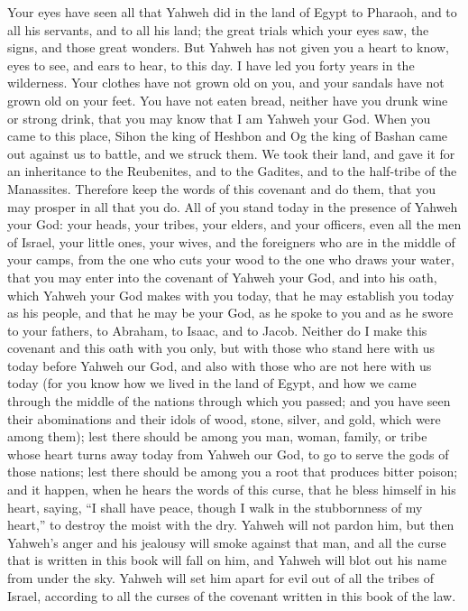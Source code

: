 Your eyes have seen all that Yahweh did in the land of Egypt to Pharaoh,
and to all his servants, and to all his land;  the great
trials which your eyes saw, the signs, and those great wonders.
 But Yahweh has not given you a heart to know, eyes to see,
and ears to hear, to this day.  I have led you forty years
in the wilderness. Your clothes have not grown old on you, and your
sandals have not grown old on your feet.  You have not eaten
bread, neither have you drunk wine or strong drink, that you may know
that I am Yahweh your God.  When you came to this place,
Sihon the king of Heshbon and Og the king of Bashan came out against us
to battle, and we struck them.  We took their land, and gave
it for an inheritance to the Reubenites, and to the Gadites, and to the
half-tribe of the Manassites.  Therefore keep the words of
this covenant and do them, that you may prosper in all that you do.
 All of you stand today in the presence of Yahweh your God:
your heads, your tribes, your elders, and your officers, even all the
men of Israel,  your little ones, your wives, and the
foreigners who are in the middle of your camps, from the one who cuts
your wood to the one who draws your water,  that you may
enter into the covenant of Yahweh your God, and into his oath, which
Yahweh your God makes with you today,  that he may
establish you today as his people, and that he may be your God, as he
spoke to you and as he swore to your fathers, to Abraham, to Isaac, and
to Jacob.  Neither do I make this covenant and this oath
with you only,  but with those who stand here with us today
before Yahweh our God, and also with those who are not here with us
today  (for you know how we lived in the land of Egypt, and
how we came through the middle of the nations through which you passed;
 and you have seen their abominations and their idols of
wood, stone, silver, and gold, which were among them); 
lest there should be among you man, woman, family, or tribe whose heart
turns away today from Yahweh our God, to go to serve the gods of those
nations; lest there should be among you a root that produces bitter
poison;  and it happen, when he hears the words of this
curse, that he bless himself in his heart, saying, ``I shall have peace,
though I walk in the stubbornness of my heart,'' to destroy the moist
with the dry.  Yahweh will not pardon him, but then
Yahweh's anger and his jealousy will smoke against that man, and all the
curse that is written in this book will fall on him, and Yahweh will
blot out his name from under the sky.  Yahweh will set him
apart for evil out of all the tribes of Israel, according to all the
curses of the covenant written in this book of the law.

